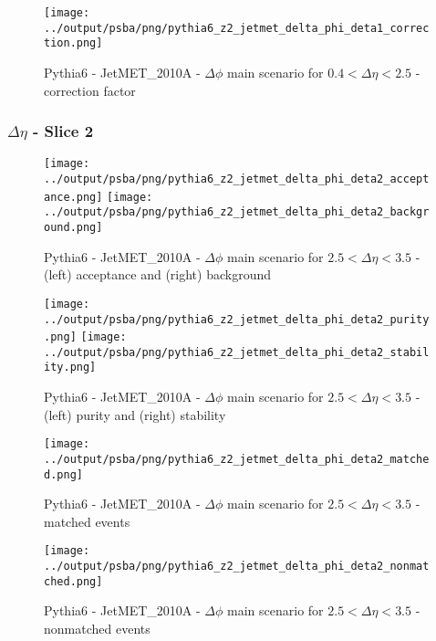 \documentclass[11pt]{book}
\begin{document}
\begin{figure}[ht]
\centering
\texttt{[image: ../output/psba/png/pythia6\_z2\_jetmet\_delta\_phi\_deta1\_correction.png]}
\caption{Pythia6 - JetMET\_2010A - $\Delta\phi$ main scenario for $0.4 < \Delta\eta < 2.5$ - correction factor}
\label{fig:p6_jetmet_delta_phi_deta1_correction}
\end{figure}

\clearpage
\subsubsection{$\Delta\eta$ - Slice 2}

\begin{figure}[ht]
\centering
\texttt{[image: ../output/psba/png/pythia6\_z2\_jetmet\_delta\_phi\_deta2\_acceptance.png]}
\texttt{[image: ../output/psba/png/pythia6\_z2\_jetmet\_delta\_phi\_deta2\_background.png]}
\caption{Pythia6 - JetMET\_2010A - $\Delta\phi$ main scenario for $2.5 < \Delta\eta < 3.5$ - (left) acceptance and (right) background}
\label{fig:p6_jetmet_delta_phi_deta2_ab}
\end{figure}

\begin{figure}[ht]
\centering
\texttt{[image: ../output/psba/png/pythia6\_z2\_jetmet\_delta\_phi\_deta2\_purity.png]}
\texttt{[image: ../output/psba/png/pythia6\_z2\_jetmet\_delta\_phi\_deta2\_stability.png]}
\caption{Pythia6 - JetMET\_2010A - $\Delta\phi$ main scenario for $2.5 < \Delta\eta < 3.5$ - (left) purity and (right) stability}
\label{fig:p6_jetmet_delta_phi_deta2_ps}
\end{figure}

\begin{figure}[ht]
\centering
\texttt{[image: ../output/psba/png/pythia6\_z2\_jetmet\_delta\_phi\_deta2\_matched.png]}
\caption{Pythia6 - JetMET\_2010A - $\Delta\phi$ main scenario for $2.5 < \Delta\eta < 3.5$ - matched events}
\label{fig:p6_jetmet_delta_phi_deta2_matched}
\end{figure}

\begin{figure}[ht]
\centering
\texttt{[image: ../output/psba/png/pythia6\_z2\_jetmet\_delta\_phi\_deta2\_nonmatched.png]}
\caption{Pythia6 - JetMET\_2010A - $\Delta\phi$ main scenario for $2.5 < \Delta\eta < 3.5$ - nonmatched events}
\label{fig:p6_jetmet_delta_phi_deta2_nonmatched}
\end{figure}
\end{document}
